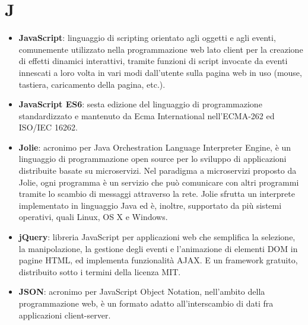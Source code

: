 \section{J}
\begin{itemize} 
	\item \textbf{JavaScript}:  linguaggio di scripting orientato agli oggetti e agli eventi, comunemente utilizzato nella programmazione web lato client per la creazione di effetti dinamici interattivi, tramite funzioni di script invocate da eventi innescati a loro volta in vari modi dall'utente sulla pagina web in uso (mouse, tastiera, caricamento della pagina, etc.). 
	\item \textbf{JavaScript ES6}: sesta edizione del linguaggio di programmazione standardizzato e mantenuto da Ecma International nell'ECMA-262 ed ISO/IEC 16262.
	\item \textbf{Jolie}: acronimo per Java Orchestration Language Interpreter Engine, è un linguaggio di programmazione open source per lo sviluppo di applicazioni distribuite basate su microservizi. Nel paradigma a microservizi proposto da Jolie, ogni programma è un servizio che può comunicare con altri programmi tramite lo scambio di messaggi attraverso la rete. Jolie sfrutta un interprete implementato in linguaggio Java ed è, inoltre, supportato da più sistemi operativi, quali Linux, OS X e Windows.
	\item \textbf{jQuery}: libreria JavaScript per applicazioni web che semplifica la selezione, la manipolazione, la gestione degli eventi e l'animazione di elementi DOM in pagine HTML, ed implementa funzionalità AJAX. \MakeUppercase{e} un framework gratuito, distribuito sotto i termini della licenza MIT.
	\item \textbf{JSON}: acronimo per JavaScript Object Notation, nell'ambito della programmazione web, è un formato adatto all'interscambio di dati fra applicazioni client-server.
\end{itemize}
